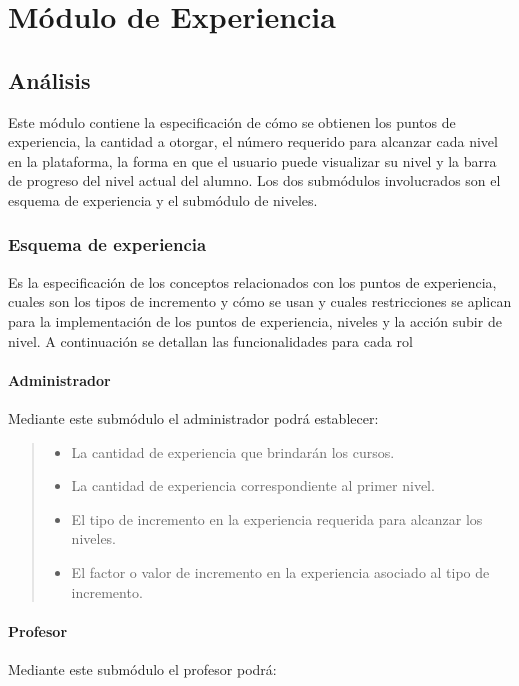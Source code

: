 \part{Módulo de Experiencia}\label{mod:exp}

\chapter{Análisis}

Este módulo contiene la especificación de cómo se obtienen los puntos de experiencia, la cantidad a otorgar, el número requerido para alcanzar cada nivel en la plataforma, la forma en que el usuario puede visualizar su nivel y la barra de progreso del nivel actual del alumno. Los dos submódulos involucrados son el esquema de experiencia y el submódulo de niveles.

\section{Esquema de experiencia}

Es la especificación de los conceptos relacionados con los puntos de experiencia, cuales son los tipos de incremento y cómo se usan y cuales restricciones se aplican para la implementación de los puntos de experiencia, niveles y la acción subir de nivel. A continuación se detallan las funcionalidades para cada rol

\subsection*{Administrador}
 \noindent Mediante este submódulo el administrador podrá establecer:

    \begin{quote}
    \begin{itemize}
        \item La cantidad de experiencia que brindarán los cursos.
        \item La cantidad de experiencia correspondiente al primer nivel.
        \item El tipo de incremento en la experiencia requerida para alcanzar los niveles.
        \item El factor o valor de incremento en la experiencia asociado al tipo de incremento.
    \end{itemize}
    \end{quote}

\subsection*{Profesor}
\noindent Mediante este submódulo el profesor podrá:


